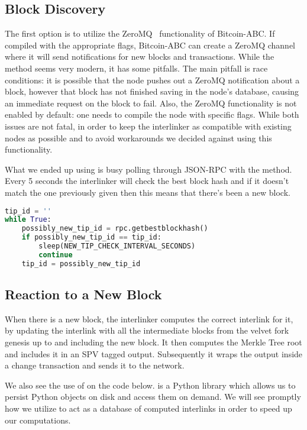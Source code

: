 \subsection{Block Discovery}

The first option is to utilize the ZeroMQ~\cite{zmq} functionality of Bitcoin-ABC. If compiled with the appropriate flags, Bitcoin-ABC can create a ZeroMQ channel where it will send notifications for new blocks and transactions. While the method seems very modern, it has some pitfalls. The main pitfall is race conditions: it is possible that the node pushes out a ZeroMQ notification about a block, however that block has not finished saving in the node's database, causing an immediate  request on the block to fail. Also, the ZeroMQ functionality is not enabled by default: one needs to compile the node with specific flags. While both issues are not fatal, in order to keep the interlinker as compatible with existing nodes as possible and to avoid workarounds we decided against using this functionality.

What we ended up using is busy polling through JSON-RPC with the  method. Every 5 seconds the interlinker will check the best block hash and if it doesn't match the one previously given then this means that there's been a new block.

\begin{lstlisting}[language=Python]
tip_id = ''
while True:
    possibly_new_tip_id = rpc.getbestblockhash()
    if possibly_new_tip_id == tip_id:
        sleep(NEW_TIP_CHECK_INTERVAL_SECONDS)
        continue
    tip_id = possibly_new_tip_id
\end{lstlisting}

\subsection{Reaction to a New Block}

When there is a new block, the interlinker computes the correct interlink for it, by updating the interlink with all the intermediate blocks from the velvet fork genesis up to and including the new block. It then computes the Merkle Tree root and includes it in an SPV tagged output. Subsequently it wraps the output inside a change transaction and sends it to the network.

We also see the use of  on the code below.  is a Python library which allows us to persist Python objects on disk and access them on demand. We will see promptly how we utilize  to act as a database of computed interlinks in order to speed up our computations.

